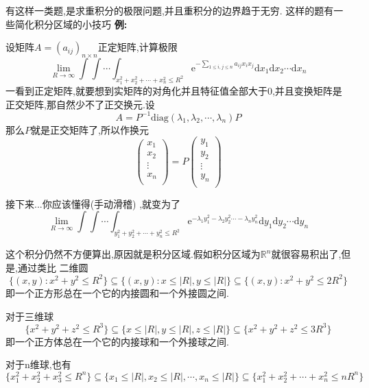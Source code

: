 \documentclass{ctexart}
\begin{document}
有这样一类题,是求重积分的极限问题,并且重积分的边界趋于无穷.
这样的题有一些简化积分区域的小技巧
\newline
\newline
\textbf{例:}

设矩阵$A=(a_{ij})_{n\times n}$正定矩阵,计算极限
$$\lim_{R\rightarrow \infty}\int\int\cdots\int_{x_{1}^{2}+x_{2}^{2}+\cdots +x_{n}^{2}\leq R^{2}}\mathrm{e}^{-\sum\limits_{1\leq i,j\leq n}a_{ij}x_{i}x_{j}}\mathrm{d}x_{1}\mathrm{d}x_{2}\cdots\mathrm{d}x_{n}$$
\newline
一看到正定矩阵,就要想到实矩阵的对角化并且特征值全部大于0,并且变换矩阵是正交矩阵,那自然少不了正交换元.设$$A=P^{-1}\mathrm{diag}(\lambda_{1},\lambda_{2},\cdots,\lambda_{n})P$$那么$P$就是正交矩阵了,所以作换元
\begin{equation}\nonumber
{
\left( \begin{array}{c}
x_{1}\\
x_{2}\\
\vdots\\
x_{n}\\
\end{array}
\right)=P\left( \begin{array}{c}
y_{1}\\
y_{2}\\
\vdots\\
y_{n}\\
\end{array}
\right)}
\end{equation}


接下来...你应该懂得(手动滑稽)
,就变为了
$$\lim_{R\rightarrow \infty}\int\int\cdots\int_{y_{1}^{2}+y_{2}^{2}+\cdots +y_{n}^{2}\leq R^{2}}\mathrm{e}^{-\lambda_{1}y_{1}^{2}-\lambda_{2}y_{2}^{2}\cdots-\lambda_{n}y_{n}^{2}}\mathrm{d}y_{1}\mathrm{d}y_{2}\cdots\mathrm{d}y_{n}$$

这个积分仍然不方便算出,原因就是积分区域.假如积分区域为$\mathbb{R}^{n}$就很容易积出了,但是,通过类比
二维圆$$\{(x,y):x^{2}+y^{2}\leq R^{2}\}\subseteq\{(x,y):x\leq |R|,y\leq |R|\}\subseteq\{(x,y):x^{2}+y^{2}\leq 2R^{2}\}$$
即一个正方形总在一个它的内接圆和一个外接圆之间.

对于三维球$$\{x^{2}+y^{2}+z^{2}\leq R^{3}\}\subseteq\{x\leq |R|,y\leq |R|,z\leq |R|\}\subseteq\{x^{2}+y^{2}+z^{2}\leq 3R^{3}\}$$
即一个正方体总在一个它的内接球和一个外接球之间.

对于n维球,也有$$\{x_{1}^{2}+x_{2}^{2}+x_{3}^{2}\leq R^{n}\}\subseteq\{x_{1}\leq |R|,x_{2}\leq |R|,\cdots,x_{n}\leq |R|\}\subseteq\{x_{1}^{2}+x_{2}^{2}+\cdots+x_{n}^{2}\leq nR^{n}\}$$
\end{document}
